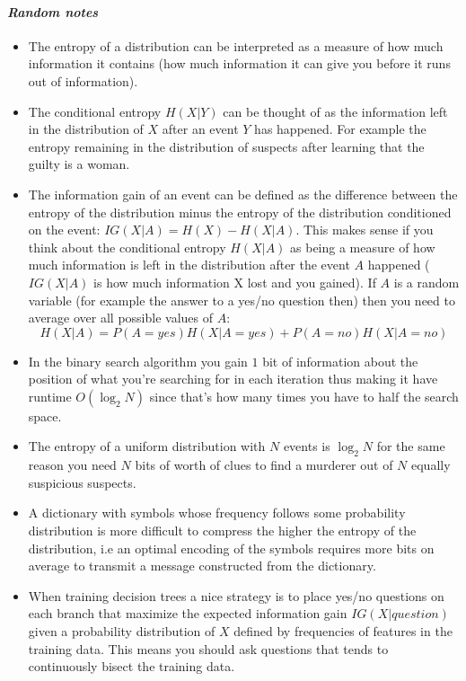 \paragraph{\textit{Random notes}}
\begin{itemize}
    \item The entropy of a distribution can be interpreted as a measure of how much information it contains (how much information it can give you before it runs out of information).
    \item
        The conditional entropy $H(X|Y)$ can be thought of as the information left in the distribution of $X$ after an event $Y$ has happened. For example the entropy remaining in the distribution of suspects after learning that the guilty is a woman.
    \item
        The information gain of an event can be defined as the difference between the entropy of the distribution minus the entropy of the distribution conditioned on the event: $IG(X|A) = H(X) - H(X|A)$. This makes sense if you think about the conditional entropy $H(X|A)$ as being a measure of how much information is left in the distribution after the event $A$ happened ($IG(X|A)$ is how much information X lost and you gained). If $A$ is a random variable (for example the answer to a yes/no question then) then you need to average over all possible values of $A$: $$H(X|A) = P(A=yes)H(X|A=yes) + P(A=no)H(X|A=no)$$
    \item
        In the binary search algorithm you gain $1$ bit of information about the position of what you're searching for in each iteration thus making it have runtime $O(\log_2{N})$ since that's how many times you have to half the search space.
    \item
        The entropy of a uniform distribution with $N$ events is $\log_2{N}$ for the same reason you need $N$ bits of worth of clues to find a murderer out of $N$ equally suspicious suspects.
    \item
        A dictionary with symbols whose frequency follows some probability distribution is more difficult to compress the higher the entropy of the distribution, i.e an optimal encoding of the symbols requires more bits on average to transmit a message constructed from the dictionary.
    \item
        When training decision trees a nice strategy is to place yes/no questions on each branch that maximize the expected information gain $IG(X|question)$ given a probability distribution of $X$ defined by frequencies of features in the training data. This means you should ask questions that tends to continuously bisect the training data.

\end{itemize}
